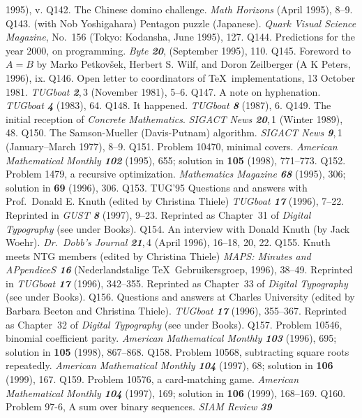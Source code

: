  1995), v.
\p Q142. The Chinese domino challenge. {\sl Math Horizons\/} (April 1995),
 8--9.
\p *Q143. (with Nob Yoshigahara) Pentagon puzzle (Japanese). {\sl Quark Visual
 Science Magazine}, No.~156 (Tokyo: Kodansha, June 1995), 127.
\p Q144. Predictions for the year 2000, on programming. {\sl Byte\/
 \bf20}, (September 1995), 110.
\p Q145. Foreword to $A=B$ by Marko Petkov\v{s}ek, Herbert S. Wilf, and
 Doron Zeilberger (A K Peters, 1996), ix.
\p Q146. Open letter to coordinators of \TeX\ implementations, 13 October 1981.
 {\sl TUGboat\/ \bf2},\,3 (November 1981), 5--6.
\p Q147. A note on hyphenation. {\sl TUGboat\/ \bf4} (1983), 64.
\p Q148. It happened. {\sl TUGboat\/ \bf8} (1987), 6.
\p Q149. The initial reception of {\sl Concrete Mathematics}.
 {\sl SIGACT News\/  \bf20},\,1 (Winter 1989), 48.
\p Q150. The Samson-Mueller (Davis-Putnam) algorithm. {\sl SIGACT News\/
 \bf9},\,1 (January--March 1977), 8--9.
\p Q151. Problem 10470, minimal covers.
 {\sl American Mathematical Monthly\/ \bf102} (1995), 655;
 solution in {\bf105} (1998), 771--773.
\p Q152. Problem 1479, a recursive optimization.
 {\sl Mathematics Magazine\/ \bf68} (1995), 306;
 solution in {\bf69} (1996), 306.
\p Q153. TUG'95 Questions and answers with Prof.~Donald E. Knuth (edited by
 Christina Thiele) {\sl TUGboat\/ \bf17} (1996), 7--22.
 Reprinted in {\sl GUST\/ \bf8} (1997), 9--23.
 Reprinted as Chapter~31 of {\sl Digital Typography\/} (see under Books).
\p Q154. An interview with Donald Knuth (by Jack Woehr). {\sl Dr.\
 Dobb's Journal\/ \bf21},\,4 (April 1996), 16--18, 20, 22.
\p Q155. Knuth meets NTG members (edited by Christina Thiele) {\sl MAPS:
 Minutes and APpendiceS\/ \bf16} (Nederlandstalige \TeX\ Gebruikersgroep,
 1996), 38--49. Reprinted in {\sl TUGboat\/ \bf17} (1996), 342--355.
 Reprinted as Chapter~33 of {\sl Digital Typography\/} (see under Books).
\p Q156. Questions and answers at Charles University (edited by Barbara Beeton
 and Christina Thiele). {\sl TUGboat\/ \bf17} (1996), 355--367.
 Reprinted as Chapter~32 of {\sl Digital Typography\/} (see under Books).
\p Q157. Problem 10546, binomial coefficient parity.
 {\sl American Mathematical Monthly\/ \bf103} (1996), 695;
 solution in {\bf105} (1998), 867--868.
\p Q158. Problem 10568, subtracting square roots repeatedly.
 {\sl American Mathematical Monthly\/ \bf104} (1997), 68;
 solution in {\bf106} (1999), 167.
\p Q159. Problem 10576, a card-matching game.
 {\sl American Mathematical Monthly\/ \bf104} (1997), 169;
 solution in {\bf106} (1999), 168--169.
\p Q160. Problem 97-6, A sum over binary sequences. {\sl SIAM Review\/ \bf39}
